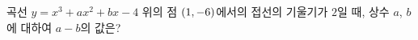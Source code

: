 곡선 $y=x^3+ax^2+bx-4$ 위의 점 $(1{,}\mkern3mu\mathopen{}-6)$에서의 접선의 기울기가 $2$일 때, 상수 $a$, $b$에 대하여 $a-b$의 값은?
